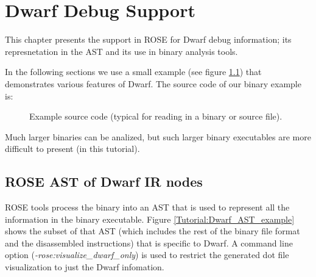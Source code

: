 \chapter{Dwarf Debug Support}

This chapter presents the support in ROSE for Dwarf debug information; its 
represnetation in the AST and its use in binary analysis tools.

In the following sections we use a small example (see figure \ref{Tutorial:dwarfAnalysisExampleSourceCode}) 
that demonstrates various features of Dwarf. The source code of our binary example is:

\begin{figure}[!h]
{\indent
{\mySmallFontSize

\begin{latexonly}
   
\end{latexonly}

\begin{htmlonly}
   
\end{htmlonly}

}
}
\caption{Example source code (typical for reading in a binary or source file).}
\label{Tutorial:dwarfAnalysisExampleSourceCode}
\end{figure}

Much larger binaries can be analized, but such larger binary executables are more
difficult to present (in this tutorial).


\section{ROSE AST of Dwarf IR nodes}

   ROSE tools process the binary into an AST that is used to represent all the
information in the binary executable.  Figure \ref{Tutorial:Dwarf_AST_example}
shows the subset of that AST (which includes the rest of the binary file format
and the disassembled instructions) that is specific to Dwarf.  A command line option
({\em -rose:visualize\_dwarf\_only}) is used to restrict the generated dot file 
visualization to just the Dwarf infomation.

